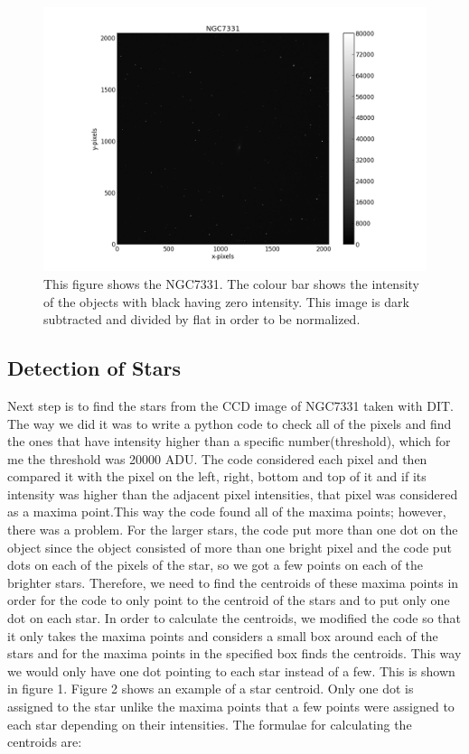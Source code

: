 \documentclass[letterpaper,12pt]{article}
\begin{document}
\FloatBarrier
\begin{figure}[h!]
\centering
\includegraphics[scale=0.5]{ngc7331.png}
\caption{This figure shows the NGC7331. The colour bar shows the intensity of the objects with black having zero intensity. This image is dark subtracted and divided by flat in order to be normalized.}
\end{figure}
\FloatBarrier


\subsection{Detection of Stars}
Next step is to find the stars from the CCD image of NGC7331 taken with DIT. The way we did it was to write a python code to check all of the pixels and find the ones that have intensity higher than a specific number(threshold), which for me the threshold was 20000 ADU. The code considered each pixel and then compared it with the pixel on the left, right, bottom and top of it and if its intensity was higher than the adjacent pixel intensities, that pixel was considered as a maxima point.This way the code found all of the maxima points; however, there was a problem. For the larger stars, the code put more than one dot on the object since the object consisted of more than one bright pixel and the code put dots on each of the pixels of the star, so we got a few points on each of the brighter stars. Therefore, we need to find the centroids of these maxima points in order for the code to only point to the centroid of the stars and to put only one dot on each star. In order to calculate the centroids, we modified the code so that it only takes the maxima points and considers a small box around each of the stars and for the maxima points in the specified box finds the centroids. This way we would only have one dot pointing to each star instead of a few. This is shown in figure 1. Figure 2 shows an example of a star centroid. Only one dot is assigned to the star unlike the maxima points that a few points were assigned to each star depending on their intensities.
The formulae for calculating the centroids are:
\end{document}

